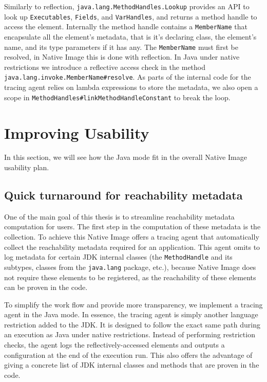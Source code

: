 Similarly to reflection, \verb|java.lang.MethodHandles.Lookup| provides an API to look up \verb|Executables|, \verb|Fields|, and \verb|VarHandles|, and returns a method handle to access the element.
Internally the method handle contains a \verb|MemberName| that encapsulate all the element's metadata, that is it's declaring class, the element's name, and its type parameters if it has any. The \verb|MemberName| must first be resolved, in Native Image this is done with reflection.   
In Java under native restrictions we introduce a reflective access check in the method \verb|java.lang.invoke.MemberName#resolve|. As parts of the internal code for the tracing agent relies on lambda expressions to store the metadata, we also open a scope in \verb|MethodHandles#linkMethodHandleConstant| to break the loop.


\section{Improving Usability}
In this section, we will see how the Java mode fit in the overall Native Image usability plan. 

\subsection{Quick turnaround for reachability metadata}
One of the main goal of this thesis is to streamline reachability metadata computation for users.
The first step in the computation of these metadata is the collection. To achieve this Native Image offers a tracing agent that automatically collect the reachability metadata required for an application. This agent omits to log metadata for certain JDK internal classes (the \verb|MethodHandle| and its subtypes, classes from the \verb|java.lang| package, etc.), because Native Image does not require these elements to be registered, as the reachability of these elements can be proven in the code.  

To simplify the work flow and provide more transparency, we implement a tracing agent in the Java mode. In essence, the tracing agent is simply another language restriction added to the JDK. It is designed to follow the exact same path during an execution as Java under native restrictions. Instead of performing restriction checks, the agent logs the reflectively-accessed elements and outputs a configuration at the end of the execution run.
This also offers the advantage of giving a concrete list of JDK internal classes and methods that are proven in the code.


